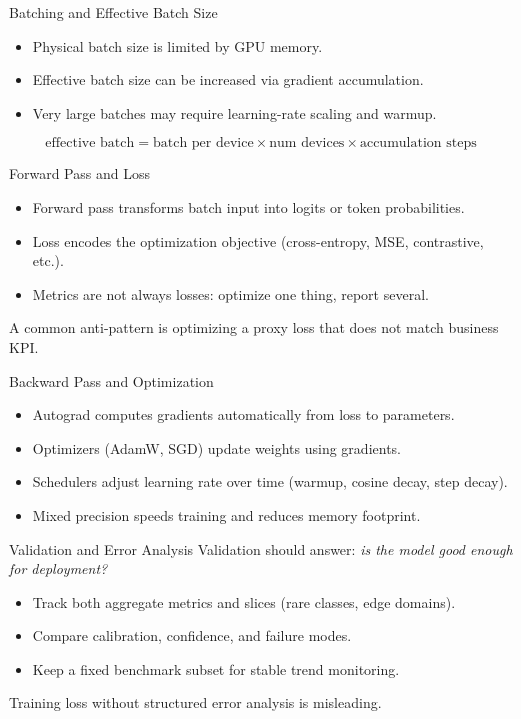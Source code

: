 \documentclass[aspectratio=169]{beamer}
\begin{document}
\begin{frame}[t]{Batching and Effective Batch Size}
\begin{itemize}
    \item Physical batch size is limited by GPU memory.
    \item Effective batch size can be increased via gradient accumulation.
    \item Very large batches may require learning-rate scaling and warmup.
\end{itemize}
\vspace{1mm}
\[
\text{effective batch} = \text{batch per device} \times \text{num devices} \times \text{accumulation steps}
\]
\end{frame}

\begin{frame}[t]{Forward Pass and Loss}
\begin{itemize}
    \item Forward pass transforms batch input into logits or token probabilities.
    \item Loss encodes the optimization objective (cross-entropy, MSE, contrastive, etc.).
    \item Metrics are not always losses: optimize one thing, report several.
\end{itemize}
\vspace{1mm}
A common anti-pattern is optimizing a proxy loss that does not match business KPI.
\end{frame}

\begin{frame}[t]{Backward Pass and Optimization}
\begin{itemize}
    \item Autograd computes gradients automatically from loss to parameters.
    \item Optimizers (AdamW, SGD) update weights using gradients.
    \item Schedulers adjust learning rate over time (warmup, cosine decay, step decay).
    \item Mixed precision speeds training and reduces memory footprint.
\end{itemize}
\end{frame}

\begin{frame}[t]{Validation and Error Analysis}
Validation should answer: \textit{is the model good enough for deployment?}
\vspace{1mm}
\begin{itemize}
    \item Track both aggregate metrics and slices (rare classes, edge domains).
    \item Compare calibration, confidence, and failure modes.
    \item Keep a fixed benchmark subset for stable trend monitoring.
\end{itemize}
\vspace{1mm}
Training loss without structured error analysis is misleading.
\end{frame}
\end{document}
